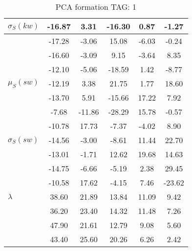 \begin{table}[h!]
\begin{center}
\begin{tabular}{| l | c | c | c | c | c |}
$\sigma_S(kw)$ & -16.87  & 3.31  & -16.30  & 0.87  & -1.27 \\\hline
 & -17.28  & -3.06  & 15.08  & -6.03  & -0.24 \\\hline
 & -16.60  & -3.09  & 9.15  & -3.64  & 8.35 \\\hline
 & -12.10  & -5.06  & -18.59  & 1.42  & -8.77 \\\hline
$\mu_S(sw)$ & -12.19  & 3.38  & 21.75  & 1.77  & 18.60 \\\hline
 & -13.70  & 5.91  & -15.66  & 17.22  & 7.92 \\\hline
 & -7.68  & -11.86  & -28.29  & 15.78  & -0.57 \\\hline
 & -10.78  & 17.73  & -7.37  & -4.02  & 8.90 \\\hline
$\sigma_S(sw)$ & -14.56  & -3.00  & -8.61  & 11.44  & 22.70 \\\hline
 & -13.01  & -1.71  & 12.62  & 19.68  & 14.63 \\\hline
 & -14.75  & -6.66  & -5.19  & 2.38  & 29.45 \\\hline
 & -10.58  & 17.62  & -4.15  & 7.46  & -23.62 \\\hline
$\lambda$ & 38.60  & 21.89  & 13.84  & 11.09  & 9.42 \\\hline
 & 36.20  & 23.40  & 14.32  & 11.48  & 7.26 \\\hline
 & 47.90  & 21.61  & 12.79  & 9.08  & 5.60 \\\hline
 & 43.40  & 25.60  & 20.26  & 6.26  & 2.42 \\\hline
\end{tabular}
\caption{PCA formation TAG: 1}
\end{center}
\end{table}